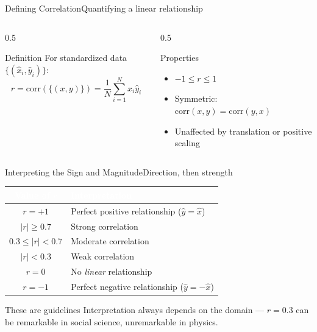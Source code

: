 \documentclass[aspectratio=169,11pt]{beamer}
\begin{document}
\begin{frame}{Defining Correlation}{Quantifying a linear relationship}
  \begin{columns}[T]
    \begin{column}{0.5\textwidth}
      \begin{block}{Definition}
        \small For standardized data $\{(\hat x_i,\hat y_i)\}$:
        \[ r = \text{corr}(\{(x,y)\}) = \frac{1}{N}\sum_{i=1}^N \hat x_i \hat y_i \]
      \end{block}
    \end{column}
    \begin{column}{0.5\textwidth}
      \begin{exampleblock}{Properties}
        \small
        \begin{itemize}
          \item $-1 \le r \le 1$
          \item Symmetric: $\text{corr}(x,y) = \text{corr}(y,x)$
          \item Unaffected by translation or positive scaling
        \end{itemize}
      \end{exampleblock}
    \end{column}
  \end{columns}
\end{frame}

\begin{frame}{Interpreting the Sign and Magnitude}{Direction, then strength}
  \small
  \renewcommand{\arraystretch}{1.3}
  \begin{center}
  \begin{tabularx}{\textwidth}{@{}c >{\raggedright\arraybackslash}X@{}}
    \toprule
    \rowcolor{PrimaryDark}
    \textcolor{white}{Value of $r$} & \textcolor{white}{Interpretation} \\
    \midrule
    $r = +1$ & Perfect positive relationship ($\hat y = \hat x$) \\
    \rowcolor{PrimaryLight!25}
    $|r| \ge 0.7$ & Strong correlation \\
    $0.3 \le |r| < 0.7$ & Moderate correlation \\
    \rowcolor{PrimaryLight!25}
    $|r| < 0.3$ & Weak correlation \\
    $r = 0$ & No \emph{linear} relationship \\
    \rowcolor{PrimaryLight!25}
    $r = -1$ & Perfect negative relationship ($\hat y = -\hat x$) \\
    \bottomrule
  \end{tabularx}
  \end{center}
  \begin{alertblock}{These are guidelines}
    \small Interpretation always depends on the domain — $r=0.3$ can be
    remarkable in social science, unremarkable in physics.
  \end{alertblock}
\end{frame}
\end{document}
